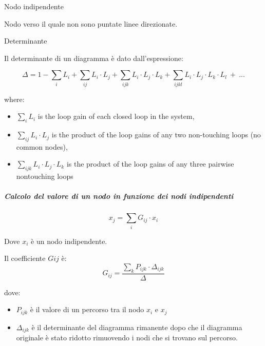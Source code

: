 \documentclass[11pt]{article}
\providecommand{\tightlist}{%
      \setlength{\itemsep}{0pt}\setlength{\parskip}{0pt}}
\begin{document}
    Nodo indipendente

Nodo verso il quale non sono puntate linee direzionate.

    Determinante

Il determinante di un diagramma è dato dall'espressione:

\begin{equation}
\Delta = 1 - \sum_i L_i +\sum_{ij} L_i \cdot L_j + \sum_{ijk} L_i \cdot L_j \cdot L_k + \sum_{ijkl} L_i \cdot L_j \cdot L_k \cdot L_l\  +\ ...
\end{equation}

    where:

\begin{itemize}
\tightlist
\item
  \(\sum_i L_i\) is the loop gain of each closed loop in the system,
\item
  \(\sum_{ij} L_i \cdot L_j\) is the product of the loop gains of any
  two non-touching loops (no common nodes),
\item
  \(\sum_{ijk} L_i \cdot L_j \cdot L_k\) is the product of the loop
  gains of any three pairwise nontouching loops
\end{itemize}

    \hypertarget{calcolo-del-valore-di-un-nodo-in-funzione-dei-nodi-indipendenti}{%
\subparagraph{Calcolo del valore di un nodo in funzione dei nodi
indipendenti}\label{calcolo-del-valore-di-un-nodo-in-funzione-dei-nodi-indipendenti}}

    \begin{equation}
x_j = \sum_i G_{ij} \cdot x_i
\end{equation}

Dove \(x_i\) è un nodo indipendente.

Il coefficiente \(G{ij}\) è: \begin{equation}
G_{ij} = \frac{\sum_k P_{ijk} \cdot \Delta_{ijk}}{\Delta}
\end{equation}

dove:

\begin{itemize}
\tightlist
\item
  \(P_{ijk}\) è il valore di un percorso tra il nodo \(x_i\) e \(x_j\)\\
\item
  \(\Delta_{ijk}\) è il determinante del diagramma rimanente dopo che il
  diagramma originale è stato ridotto rimuovendo i nodi che si trovano
  sul percorso.
\end{itemize}
\end{document}

